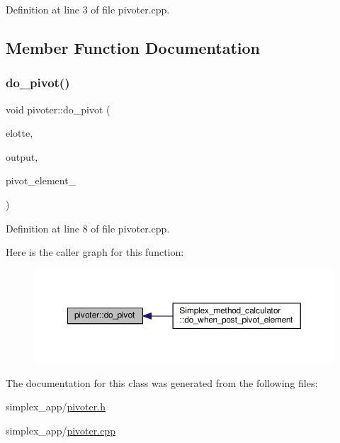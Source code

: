 Definition at line 3 of file pivoter.\+cpp.



\subsection{Member Function Documentation}
\mbox{\label{classpivoter_a65c7ac806d2eee63243e9d7394e76394}} 
\subsubsection{\texorpdfstring{do\+\_\+pivot()}{do\_pivot()}}
{\footnotesize\ttfamily void pivoter\+::do\+\_\+pivot (\begin{DoxyParamCaption}\item[{Q\+Standard\+Item\+Model $\ast$}]{elotte,  }\item[{Q\+Standard\+Item\+Model $\ast$}]{output,  }\item[{Q\+Model\+Index}]{pivot\+\_\+element\+\_\+ }\end{DoxyParamCaption})}



Definition at line 8 of file pivoter.\+cpp.

Here is the caller graph for this function\+:\nopagebreak
\begin{figure}[H]
\begin{center}
\leavevmode
\includegraphics[width=350pt]{classpivoter_a65c7ac806d2eee63243e9d7394e76394_icgraph}
\end{center}
\end{figure}


The documentation for this class was generated from the following files\+:\begin{DoxyCompactItemize}
\item 
simplex\+\_\+app/\hyperlink{pivoter_8h}{pivoter.\+h}\item 
simplex\+\_\+app/\hyperlink{pivoter_8cpp}{pivoter.\+cpp}\end{DoxyCompactItemize}
